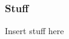 \documentclass{beamer}
\begin{document}
\begin{frame}
\frametitle{Stuff}
Insert stuff here

\end{frame}

\begin{frame}
\end{frame}
\end{document}
